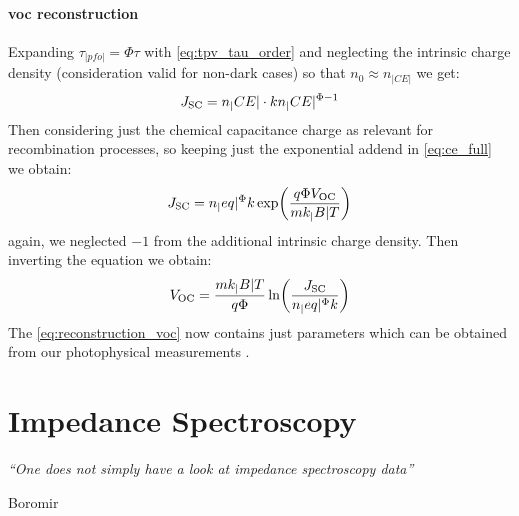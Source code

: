 	\paragraph{\Gls{voc} reconstruction}
	Expanding $\tau_|pfo| = \Phi \tau$ with \cref{eq:tpv_tau_order} and neglecting the intrinsic charge density (consideration valid for non-dark cases) so that $n_0 \approx n_|CE|$ we get:
	\begin{equation}
		J_\mathrm{SC} = n_|CE| \cdot k n_|CE|^{\Phi-1}
	\end{equation}
	Then considering just the chemical capacitance charge as relevant for recombination processes, so keeping just the exponential addend in \cref{eq:ce_full} we obtain:
	\begin{equation}
		J_\mathrm{SC} = n_|eq|^\Phi k \exp(\frac{q \Phi V_\mathrm{OC}}{m k_|B| T})
	\end{equation}
	again, we neglected $-1$ from the additional intrinsic charge density. Then inverting the equation we obtain:
	\begin{equation}\label{eq:reconstruction_voc}
		V_\mathrm{OC} = \frac{m k_|B| T}{q \Phi} \ln( \frac{J_\mathrm{SC}}{n_|eq|^\Phi k} )
	\end{equation}
	The \cref{eq:reconstruction_voc} now contains just parameters which can be obtained from our photophysical measurements \cite{Wheeler2015,Wheeler2017,Du2018,Barnes2011a}.

\section{Impedance Spectroscopy}\label{characterization_impedance}
	\epigraph{\textit{\enquote{One does not simply have a look at impedance spectroscopy data}}}{Boromir}

